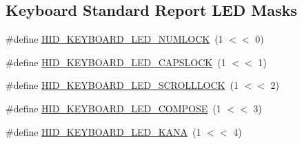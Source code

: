 \subsection*{Keyboard Standard Report L\+ED Masks}
\begin{DoxyCompactItemize}
\item 
\#define \hyperlink{group__Group__USBClassHIDCommon_gaff17a4a54a2ef2a21248f1da00ca1103}{H\+I\+D\+\_\+\+K\+E\+Y\+B\+O\+A\+R\+D\+\_\+\+L\+E\+D\+\_\+\+N\+U\+M\+L\+O\+CK}~(1 $<$$<$ 0)
\item 
\#define \hyperlink{group__Group__USBClassHIDCommon_ga9326578abd5302d4394f19cbddc34704}{H\+I\+D\+\_\+\+K\+E\+Y\+B\+O\+A\+R\+D\+\_\+\+L\+E\+D\+\_\+\+C\+A\+P\+S\+L\+O\+CK}~(1 $<$$<$ 1)
\item 
\#define \hyperlink{group__Group__USBClassHIDCommon_gae94dc08cfdfe45e6bda43996caf29007}{H\+I\+D\+\_\+\+K\+E\+Y\+B\+O\+A\+R\+D\+\_\+\+L\+E\+D\+\_\+\+S\+C\+R\+O\+L\+L\+L\+O\+CK}~(1 $<$$<$ 2)
\item 
\#define \hyperlink{group__Group__USBClassHIDCommon_ga9f98e842bd81b21e0905f8fed67f2324}{H\+I\+D\+\_\+\+K\+E\+Y\+B\+O\+A\+R\+D\+\_\+\+L\+E\+D\+\_\+\+C\+O\+M\+P\+O\+SE}~(1 $<$$<$ 3)
\item 
\#define \hyperlink{group__Group__USBClassHIDCommon_ga906618b4949d3380586f6c78af3e0ce2}{H\+I\+D\+\_\+\+K\+E\+Y\+B\+O\+A\+R\+D\+\_\+\+L\+E\+D\+\_\+\+K\+A\+NA}~(1 $<$$<$ 4)
\end{DoxyCompactItemize}
